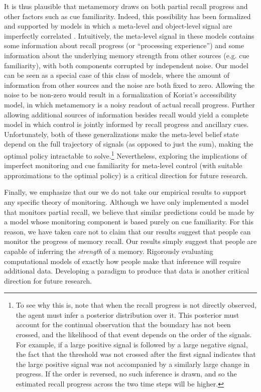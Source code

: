 It is thus plausible that metamemory draws on both partial recall progress and other factors such as cue familiarity. Indeed, this possibility has been formalized and supported by models in which a meta-level and object-level signal are imperfectly correlated \citep{fleming2017selfevaluation,jang2012stochastic,hu2021bayesian}. Intuitively, the meta-level signal in these models contains some information about recall progress (or ``processing experience'') and some information about the underlying memory strength from other sources (e.g. cue familiarity), with both components corrupted by independent noise. Our model can be seen as a special case of this class of models, where the amount of information from other sources and the noise are both fixed to zero. Allowing the noise to be non-zero would result in a formalization of Koriat's \citeyearpar{koriat1993how} accessibility model, in which metamemory is a noisy readout of actual recall progress. Further allowing additional sources of information besides recall would yield a complete model in which control is jointly informed by recall progress and ancillary cues. Unfortunately, both of these generalizations make the meta-level belief state depend on the full trajectory of signals (as opposed to just the sum), making the optimal policy intractable to solve.\footnote{%
  To see why this is, note that when the recall progress is not directly observed, the agent must infer a posterior distribution over it. This posterior must account for the continual observation that the boundary has not been crossed, and the likelihood of that event depends on the order of the signals. For example, if a large positive signal is followed by a large negative signal, the fact that the threshold was not crossed after the first signal indicates that the large positive signal was not accompanied by a similarly large change in progress. If the order is reversed, no such inference is drawn, and so the estimated recall progress across the two time steps will be higher.
} Nevertheless, exploring the implications of imperfect monitoring and cue familiarity for meta-level control (with suitable approximations to the optimal policy) is a critical direction for future research.

Finally, we emphasize that our we do not take our empirical results to support any specific theory of monitoring. Although we have only implemented a model that monitors partial recall, we believe that similar predictions could be made by a model whose monitoring component is based purely on cue familiarity. For this reason, we have taken care not to claim that our results suggest that people can monitor the progress of memory recall. Our results simply suggest that people are capable of inferring the \emph{strength} of a memory. Rigorously evaluating computational models of exactly how people make that inference will require additional data. Developing a paradigm to produce that data is another critical direction for future research.

